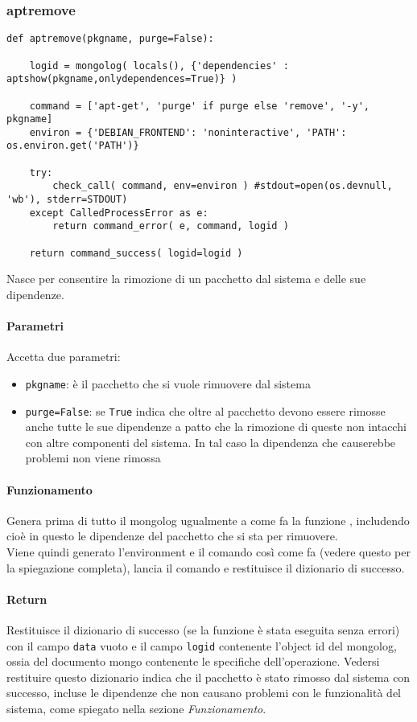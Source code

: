 \documentclass[11pt]{article}
\begin{document}
\subsubsection{aptremove}\label{aptremove}
\begin{lstlisting}
def aptremove(pkgname, purge=False):

    logid = mongolog( locals(), {'dependencies' : aptshow(pkgname,onlydependences=True)} )

    command = ['apt-get', 'purge' if purge else 'remove', '-y', pkgname]
    environ = {'DEBIAN_FRONTEND': 'noninteractive', 'PATH': os.environ.get('PATH')}

    try:
        check_call( command, env=environ ) #stdout=open(os.devnull, 'wb'), stderr=STDOUT)
    except CalledProcessError as e:
        return command_error( e, command, logid )
    
    return command_success( logid=logid )
\end{lstlisting}
Nasce per consentire la rimozione di un pacchetto dal sistema e delle sue dipendenze.
\paragraph{Parametri}
Accetta due parametri:
\begin{itemize}
	\item{\texttt{pkgname}: è il pacchetto che si vuole rimuovere dal sistema}
	\item{\texttt{purge=False}: se \texttt{True} indica che oltre al pacchetto devono essere rimosse anche tutte le
		sue dipendenze a patto che la rimozione di queste non intacchi con altre componenti del sistema. In tal
		caso la dipendenza che causerebbe problemi non viene rimossa}
\end{itemize}
\paragraph{Funzionamento}
Genera prima di tutto il mongolog ugualmente a come fa la funzione , includendo cioè in questo
le dipendenze del pacchetto che si sta per rimuovere.\\
Viene quindi generato l'environment e il comando così come fa  (vedere questo per la spiegazione
completa), lancia il comando e restituisce il dizionario di successo.
\paragraph{Return}
Restituisce il dizionario di successo (se la funzione è stata eseguita senza errori) con il campo \texttt{data} vuoto
e il campo \texttt{logid} contenente l'object id del mongolog, ossia del documento mongo contenente le specifiche
dell'operazione. Vedersi restituire questo dizionario indica che il pacchetto è stato rimosso dal sistema
con successo, incluse le dipendenze che non causano problemi con le funzionalità del sistema, come spiegato
nella sezione \textit{Funzionamento}.
\end{document}
